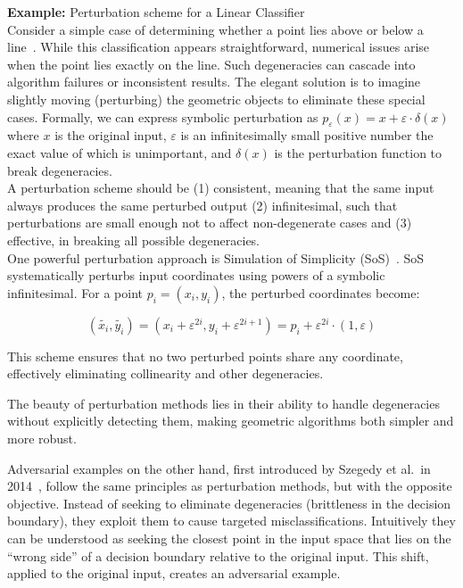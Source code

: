 \documentclass[a4paper, oneside]{discothesis}
\begin{document}
\begin{highlightbox}
	\textbf{Example:} Perturbation scheme for a Linear Classifier \\

	Consider a simple case of determining whether a point lies above or below a line~\cite{de2000computational}. While this classification appears straightforward, numerical issues arise when the point lies exactly on the line. Such degeneracies can cascade into algorithm failures or inconsistent results. The elegant solution is to imagine slightly moving (perturbing) the geometric objects to eliminate these special cases. Formally, we can express symbolic perturbation as $p_\varepsilon(x) = x + \varepsilon \cdot \delta(x)$ where $x$ is the original input, $\varepsilon$ is an infinitesimally small positive number the exact value of which is unimportant, and $\delta(x)$ is the perturbation function to break degeneracies. \\

	A perturbation scheme should be (1) consistent, meaning that the same input always produces the same perturbed output (2) infinitesimal, such that perturbations are small enough not to affect non-degenerate cases and (3) effective, in breaking all possible degeneracies. \\

	One powerful perturbation approach is Simulation of Simplicity (SoS)~\cite{franklin2022implementing, edelsbrunner2002topological, edelsbrunner2001sink, edelsbrunner1990simulation, levy2016robustness, schorn1993axiomatic}. SoS systematically perturbs input coordinates using powers of a symbolic infinitesimal. For a point $p_i = (x_i, y_i)$, the perturbed coordinates become:

	$$(\tilde{x_i}, \tilde{y_i}) = (x_i + \varepsilon^{2i}, y_i + \varepsilon^{2i+1}) = p_i + \varepsilon^{2i} \cdot (1, \varepsilon)$$

	This scheme ensures that no two perturbed points share any coordinate, effectively eliminating collinearity and other degeneracies.
\end{highlightbox}

The beauty of perturbation methods lies in their ability to handle degeneracies without explicitly detecting them, making geometric algorithms both simpler and more robust.

Adversarial examples on the other hand, first introduced by Szegedy et al.\ in 2014~\cite{szegedy2013intriguing}, follow the same principles as perturbation methods, but with the opposite objective. Instead of seeking to eliminate degeneracies (brittleness in the decision boundary), they exploit them to cause targeted misclassifications. Intuitively they can be understood as seeking the closest point in the input space that lies on the ``wrong side'' of a decision boundary relative to the original input. This shift, applied to the original input, creates an adversarial example.
\end{document}
